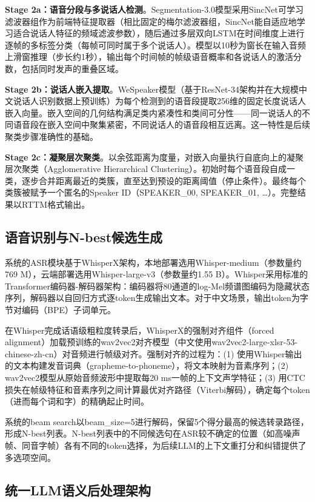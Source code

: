 \documentclass[12pt, a4paper]{article}
\begin{document}
\textbf{Stage 2a：语音分段与多说话人检测}。Segmentation-3.0模型采用SincNet可学习滤波器组作为前端特征提取器（相比固定的梅尔滤波器组，SincNet能自适应地学习适合说话人特征的频域滤波参数），随后通过多层双向LSTM在时间维度上进行逐帧的多标签分类（每帧可同时属于多个说话人）。模型以10秒为窗长在输入音频上滑窗推理（步长约1秒），输出每个时间帧的帧级语音概率和各说话人的激活分数，包括同时发声的重叠区域。

\textbf{Stage 2b：说话人嵌入提取}。WeSpeaker模型（基于ResNet-34架构并在大规模中文说话人识别数据上预训练）为每个检测到的语音段提取256维的固定长度说话人嵌入向量。嵌入空间的几何结构满足类内紧凑性和类间可分性——同一说话人的不同语音段在嵌入空间中聚集紧密，不同说话人的语音段相互远离。这一特性是后续聚类步骤准确性的基础。

\textbf{Stage 2c：凝聚层次聚类}。以余弦距离为度量，对嵌入向量执行自底向上的凝聚层次聚类（Agglomerative Hierarchical Clustering）。初始时每个语音段自成一类，逐步合并距离最近的类簇，直至达到预设的距离阈值（停止条件）。最终每个类簇被赋予一个匿名的Speaker ID（SPEAKER\_00, SPEAKER\_01, …）。完整结果以RTTM格式输出。

\subsection{语音识别与N-best候选生成}

系统的ASR模块基于WhisperX架构，本地部署选用Whisper-medium（参数量约769 M），云端部署选用Whisper-large-v3（参数量约1.55 B）。Whisper采用标准的Transformer编码器-解码器架构：编码器将80通道的log-Mel频谱图编码为隐藏状态序列，解码器以自回归方式逐token生成输出文本。对于中文场景，输出token为字节对编码（BPE）子词单元。

在Whisper完成话语级粗粒度转录后，WhisperX的强制对齐组件（forced alignment）加载预训练的wav2vec2对齐模型（中文使用wav2vec2-large-xlsr-53-chinese-zh-cn）对音频进行帧级对齐。强制对齐的过程为：(1) 使用Whisper输出的文本构建发音词典（grapheme-to-phoneme），将文本映射为音素序列；(2) wav2vec2模型从原始音频波形中提取每20 ms一帧的上下文声学特征；(3) 用CTC损失在帧级特征和音素序列之间计算最优对齐路径（Viterbi解码），确定每个token（进而每个词和字）的精确起止时间。

系统的beam search以beam\_size=5进行解码，保留5个得分最高的候选转录路径，形成N-best列表。N-best列表中的不同候选句在ASR较不确定的位置（如高噪声帧、同音字帧）各有不同的token选择，为后续LLM的上下文重打分和纠错提供了多选项空间。

\subsection{统一LLM语义后处理架构}
\end{document}
